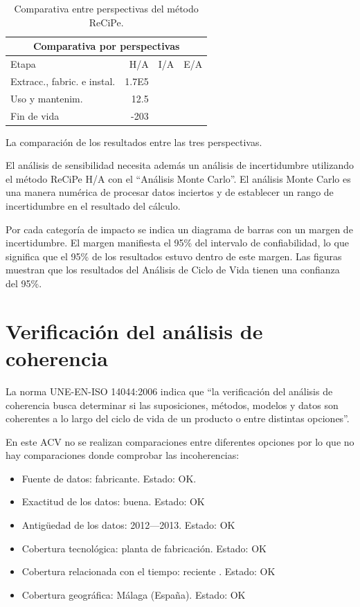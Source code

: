 \begin{table}[!htb]
\centering
\begin{tabular}{p{6cm}rrr}
\toprule
\multicolumn{4}{c}{Comparativa por perspectivas}\\
\midrule
Etapa & H/A & I/A & E/A\\
\midrule
Extracc., fabric. e instal. & 1.7E5 & &\\
Uso y mantenim. & 12.5 & &\\
Fin de vida & -203 & &\\
\bottomrule
\end{tabular}
\caption{Comparativa entre perspectivas del método ReCiPe.}
\label{comparativaperspectivas}
\end{table}

La comparación de los resultados entre las tres perspectivas.

El análisis de sensibilidad necesita además un análisis de incertidumbre utilizando el método ReCiPe H/A con el ``Análisis Monte Carlo''. El análisis Monte Carlo es una manera numérica de procesar datos inciertos y de establecer un rango de incertidumbre en el resultado del cálculo.

Por cada categoría de impacto se indica un diagrama de barras con un margen de incertidumbre. El margen manifiesta el 95\% del intervalo de confiabilidad, lo que significa que el 95\% de los resultados estuvo dentro de este margen. Las figuras muestran que los resultados del Análisis de Ciclo de Vida tienen una confianza del 95\%.


\section{Verificación del análisis de coherencia}

La norma UNE-EN-ISO 14044:2006 indica que ``la verificación del análisis de coherencia busca determinar si las suposiciones, métodos, modelos y datos son coherentes a lo largo del ciclo de vida de un producto o entre distintas opciones''.

En este ACV no se realizan comparaciones entre diferentes opciones por lo que no hay comparaciones donde comprobar las incoherencias:

\begin{itemize}
  \item Fuente de datos: fabricante. Estado: OK.
  \item Exactitud de los datos: buena. Estado: OK
  \item Antigüedad de los datos: 2012—2013. Estado: OK
  \item Cobertura tecnológica: planta de fabricación. Estado: OK
  \item Cobertura relacionada con el tiempo: reciente . Estado: OK
  \item Cobertura geográfica: Málaga (España). Estado: OK
\end{itemize}

